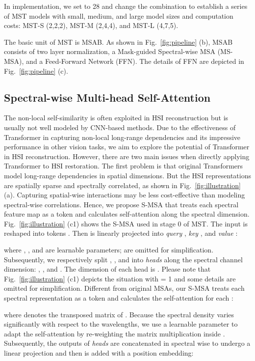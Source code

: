 \documentclass[10pt,twocolumn,letterpaper]{article}
\begin{document}
In implementation, we set  to 28 and change the combination  to establish a series of MST models with small, medium, and large model sizes and computation costs: MST-S (2,2,2), MST-M (2,4,4), and MST-L (4,7,5).

The basic unit of MST is MSAB. As shown in Fig.~\ref{fig:pipeline} (b), MSAB consists of two layer normalization, a Mask-guided Spectral-wise MSA (MS-MSA), and a Feed-Forward Network (FFN). The details of FFN are depicted in Fig.~\ref{fig:pipeline} (c). 


\subsection{Spectral-wise Multi-head Self-Attention}
The non-local self-similarity is often exploited in HSI reconstruction but is usually not well modeled by CNN-based methods. Due to the effectiveness of Transformer in capturing non-local long-range dependencies and its impressive performance in other vision tasks, we aim to explore the potential of Transformer in HSI reconstruction. However, there are two main issues when directly applying Transformer to HSI restoration. The first problem is that original Transformers model long-range dependencies in spatial dimensions. But the HSI representations are spatially sparse and spectrally  correlated, as shown in Fig.~\ref{fig:illustration} (a). Capturing spatial-wise interactions may be less cost-effective than modeling spectral-wise correlations.  Hence, we propose S-MSA that treats each spectral feature map as a token and calculates self-attention along the spectral dimension. Fig.~\ref{fig:illustration} (c1) shows the S-MSA used in stage 0 of MST. The input  is reshaped into tokens . Then  is linearly projected into \emph{query} , \emph{key} , and \emph{value} : 
\vspace{0.2mm}

where , , and  are learnable parameters;  are omitted for simplification. Subsequently, we respectively split , , and  into  \emph{heads} along the spectral channel dimension: , , and . The dimension of each head is . Please note that Fig.~\ref{fig:illustration} (c1) depicts the situation with  = 1 and some details are omitted for simplification. Different from original MSAs, our S-MSA treats each spectral representation as a token and calculates the self-attention for each :
\vspace{-0.2mm}

where  denotes the transposed matrix of . Because the spectral density varies significantly with respect to the wavelengths, we use a learnable parameter  to adapt the self-attention  by re-weighting the matrix multiplication  inside . Subsequently, the outputs of  \emph{heads} are concatenated in spectral wise to undergo a linear projection and then is added with a position embedding:
\end{document}
